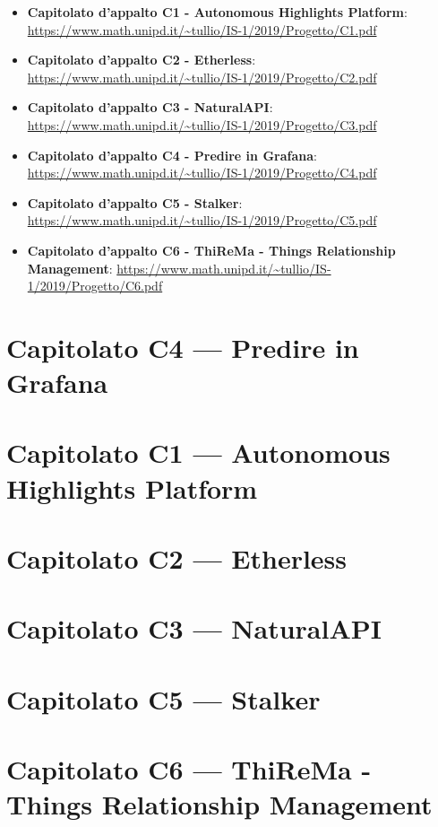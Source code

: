 \documentclass{article}
\begin{document}
\begin{itemize}
  \item \textbf{Capitolato d'appalto C1 - Autonomous Highlights Platform}: \url{https://www.math.unipd.it/~tullio/IS-1/2019/Progetto/C1.pdf}
  \item \textbf{Capitolato d'appalto C2 - Etherless}: \url{https://www.math.unipd.it/~tullio/IS-1/2019/Progetto/C2.pdf}
  \item \textbf{Capitolato d'appalto C3 - NaturalAPI}: \url{https://www.math.unipd.it/~tullio/IS-1/2019/Progetto/C3.pdf}
  \item \textbf{Capitolato d'appalto C4 - Predire in Grafana}: \url{https://www.math.unipd.it/~tullio/IS-1/2019/Progetto/C4.pdf}
  \item \textbf{Capitolato d'appalto C5 - Stalker}: \url{https://www.math.unipd.it/~tullio/IS-1/2019/Progetto/C5.pdf}
  \item \textbf{Capitolato d'appalto C6 - ThiReMa - Things Relationship Management}: \url{https://www.math.unipd.it/~tullio/IS-1/2019/Progetto/C6.pdf}
\end{itemize}

\newpage
\section{Capitolato C4 --- Predire in Grafana}%
\label{sec:c4}


\newpage
\section{Capitolato C1 --- Autonomous Highlights Platform}%
\label{sec:c1}


\newpage
\section{Capitolato C2 --- Etherless}%
\label{sec:c2}


\newpage
\section{Capitolato C3 ---  NaturalAPI}%
\label{sec:c3}


\newpage
\section{Capitolato C5 --- Stalker}%
\label{sec:c5}


\newpage
\section{Capitolato C6 --- ThiReMa - Things Relationship Management}%
\label{sec:c6}

\end{document}
